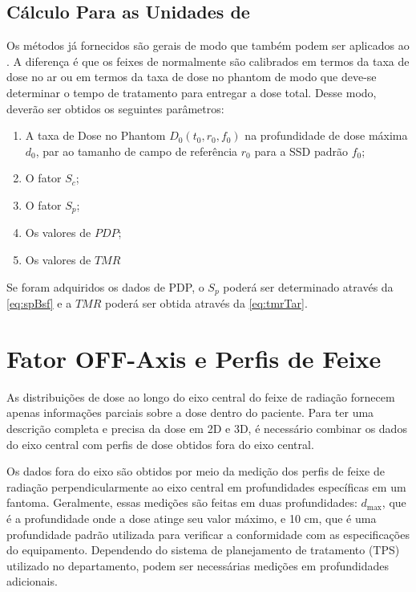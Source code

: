 \documentclass[11pt,a4paper]{article}
\begin{document}
    \subsection*{Cálculo Para as Unidades de }

        Os métodos já fornecidos são gerais de modo que também podem ser aplicados ao . A diferença é que os feixes de  normalmente são calibrados em termos da taxa de dose no ar ou em termos da taxa de dose no phantom de modo que deve-se determinar o tempo de tratamento para entregar a dose total. Desse modo, deverão ser obtidos os seguintes parâmetros:

        \begin{enumerate}[label=\textcolor{CarnationPink}{(\alph*)}]
            \item A taxa de Dose no Phantom $D_0(t_0, r_0, f_0)$ na profundidade de dose máxima $d_0$, par ao tamanho de campo de referência $r_0$ para a SSD padrão $f_0$;
            \item O fator $S_c$;
            \item O fator $S_p$;
            \item Os valores de $PDP$;
            \item Os valores de $TMR$
        \end{enumerate}

        Se foram adquiridos os dados de PDP, o $S_p$ poderá ser determinado através da \ref{eq:spBsf} e a $TMR$ poderá ser obtida através da \ref{eq:tmrTar}.

\section{Fator OFF-Axis e Perfis de Feixe}


    As distribuições de dose ao longo do eixo central do feixe de radiação fornecem apenas informações parciais sobre a dose dentro do paciente. Para ter uma descrição completa e precisa da dose em 2D e 3D, é necessário combinar os dados do eixo central com perfis de dose obtidos fora do eixo central. 

    Os dados fora do eixo são obtidos por meio da medição dos perfis de feixe de radiação perpendicularmente ao eixo central em profundidades específicas em um fantoma. Geralmente, essas medições são feitas em duas profundidades: $d_{\text{max}}$, que é a profundidade onde a dose atinge seu valor máximo, e 10 cm, que é uma profundidade padrão utilizada para verificar a conformidade com as especificações do equipamento. Dependendo do sistema de planejamento de tratamento (TPS) utilizado no departamento, podem ser necessárias medições em profundidades adicionais.
\end{document}
